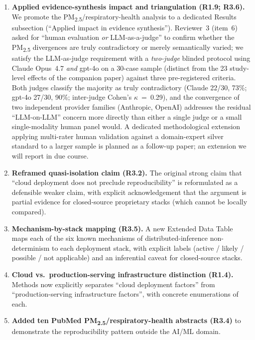 \documentclass[11pt,a4paper]{article}
\begin{document}
\begin{enumerate}
  \item \textbf{Applied evidence-synthesis impact and triangulation (R1.9; R3.6).} We promote the PM\textsubscript{2.5}/respiratory-health analysis to a dedicated Results subsection (``Applied impact in evidence synthesis''). Reviewer~3 (item~6) asked for ``human evaluation \emph{or} LLM-as-a-judge'' to confirm whether the PM\textsubscript{2.5} divergences are truly contradictory or merely semantically varied; we satisfy the LLM-as-judge requirement with a \emph{two-judge} blinded protocol using Claude Opus~4.7 \emph{and} gpt-4o on a 30-case sample (distinct from the 23 study-level effects of the companion paper) against three pre-registered criteria. Both judges classify the majority as truly contradictory (Claude 22/30, 73\%; gpt-4o 27/30, 90\%; inter-judge Cohen's $\kappa$~=~0.29), and the convergence of two independent provider families (Anthropic, OpenAI) addresses the residual ``LLM-on-LLM'' concern more directly than either a single judge or a small single-modality human panel would. A dedicated methodological extension applying multi-rater human validation against a domain-expert silver standard to a larger sample is planned as a follow-up paper; an extension we will report in due course.

  \item \textbf{Reframed quasi-isolation claim (R3.2).} The original strong claim that ``cloud deployment does not preclude reproducibility'' is reformulated as a defensible weaker claim, with explicit acknowledgement that the argument is partial evidence for closed-source proprietary stacks (which cannot be locally compared).

  \item \textbf{Mechanism-by-stack mapping (R3.5).} A new Extended Data Table maps each of the six known mechanisms of distributed-inference non-determinism to each deployment stack, with explicit labels (active / likely / possible / not applicable) and an inferential caveat for closed-source stacks.

  \item \textbf{Cloud vs.\ production-serving infrastructure distinction (R1.4).} Methods now explicitly separates ``cloud deployment factors'' from ``production-serving infrastructure factors'', with concrete enumerations of each.

  \item \textbf{Added ten PubMed PM\textsubscript{2.5}/respiratory-health abstracts (R3.4)} to demonstrate the reproducibility pattern outside the AI/ML domain.


\end{enumerate}
\end{document}
